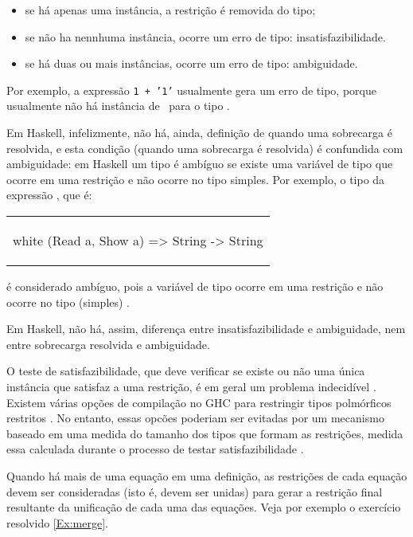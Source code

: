 \begin{itemize}
  \item se há apenas uma instância, a restrição é removida do tipo;
  \item se não ha nennhuma instância, ocorre um erro de tipo:
    insatisfazibilidade.
  \item se há duas ou mais instâncias, ocorre um erro de tipo: ambiguidade.
\end{itemize}

Por exemplo, a expressão {\tt 1 + '1'} usualmente gera um erro de
tipo, porque usualmente não há instância de \Num\ para o tipo \Char.

Em Haskell, infelizmente, não há, ainda, definição de quando uma
sobrecarga é resolvida, e esta condição (quando uma sobrecarga é
resolvida) é confundida com ambiguidade: em Haskell um tipo é ambíguo
se existe uma variável de tipo que ocorre em uma restrição e não
ocorre no tipo simples. Por exemplo, o tipo da expressão
,
que é:
\begin{center}
\begin{tabular}{l}
\begin{alg}{.9\textwidth}{white}
  (Read a, Show a) => String -> String
\end{alg}
\end{tabular}
\end{center}
é considerado ambíguo, pois a variável de tipo  ocorre em uma
restrição e não ocorre no tipo (simples) .

Em Haskell, não há, assim, diferença entre insatisfazibilidade e
ambiguidade, nem entre sobrecarga resolvida e ambiguidade.

O teste de satisfazibilidade, que deve verificar se existe ou não uma
única instância que satisfaz a uma restrição, é em geral um problema
indecidível \cite{Smith91,VolpanoSmith91}. Existem várias opções de
compilação no GHC para restringir tipos polmórficos restritos
\cite{GHC}. No entanto, essas opcões poderiam ser evitadas por um
mecanismo baseado em uma medida do tamanho dos tipos que formam as
restrições, medida essa calculada durante o processo de testar
satisfazibilidade 
\cite{Ambig-and-cxt-dep-overloading-2013,Ambig-and-constrained-poly-2016}.

Quando há mais de uma equação em uma definição, as restrições de cada
equação devem ser consideradas (isto é, devem ser unidas) para gerar a
restrição final resultante da unificação de cada uma das
equações. Veja por exemplo o exercício resolvido \ref{Ex:merge}.


